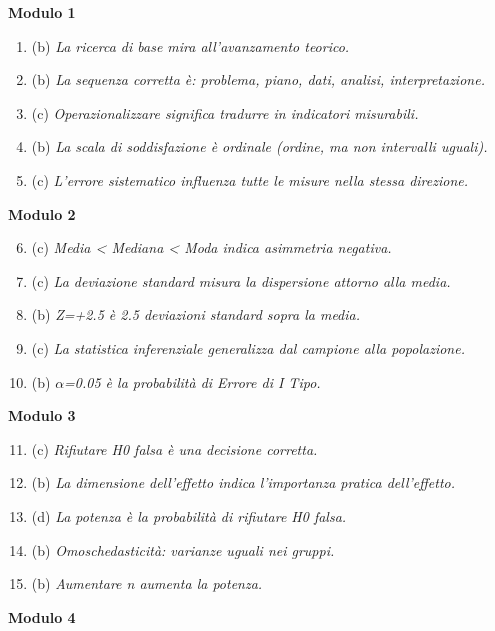 \documentclass[12pt, a4paper]{article}
\begin{document}
\begin{footnotesize}
\begin{multicols}{2}
\textbf{Modulo 1}
\begin{enumerate}
    \item (b) \textit{La ricerca di base mira all'avanzamento teorico.}
    \item (b) \textit{La sequenza corretta è: problema, piano, dati, analisi, interpretazione.}
    \item (c) \textit{Operazionalizzare significa tradurre in indicatori misurabili.}
    \item (b) \textit{La scala di soddisfazione è ordinale (ordine, ma non intervalli uguali).}
    \item (c) \textit{L'errore sistematico influenza tutte le misure nella stessa direzione.}
\end{enumerate}
\vspace{0.5cm}
\textbf{Modulo 2}
\begin{enumerate}
    \setcounter{enumi}{5} %
    \item (c) \textit{Media < Mediana < Moda indica asimmetria negativa.}
    \item (c) \textit{La deviazione standard misura la dispersione attorno alla media.}
    \item (b) \textit{Z=+2.5 è 2.5 deviazioni standard sopra la media.}
    \item (c) \textit{La statistica inferenziale generalizza dal campione alla popolazione.}
    \item (b) \textit{$\alpha$=0.05 è la probabilità di Errore di I Tipo.}
\end{enumerate}
\vspace{0.5cm}
\textbf{Modulo 3}
\begin{enumerate}
    \setcounter{enumi}{10} %
    \item (c) \textit{Rifiutare H0 falsa è una decisione corretta.}
    \item (b) \textit{La dimensione dell'effetto indica l'importanza pratica dell'effetto.}
    \item (d) \textit{La potenza è la probabilità di rifiutare H0 falsa.}
    \item (b) \textit{Omoschedasticità: varianze uguali nei gruppi.}
    \item (b) \textit{Aumentare n aumenta la potenza.}
\end{enumerate}
\columnbreak %
\textbf{Modulo 4}

\end{multicols}
\end{footnotesize}
\end{document}
